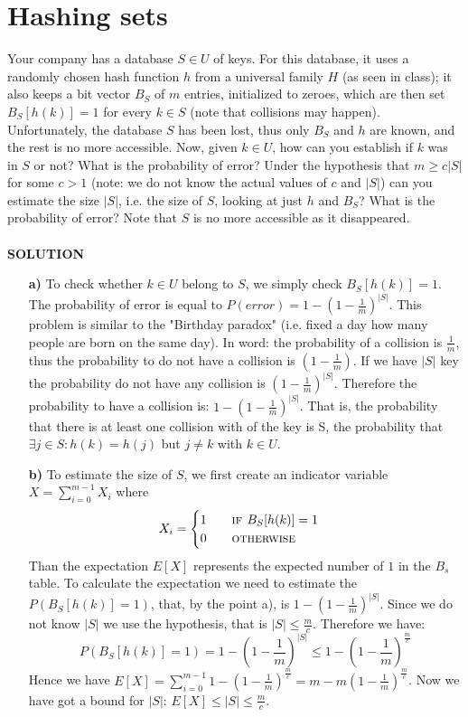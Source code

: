 \documentclass[a4paper]{article}
\begin{document}
\section*{Hashing sets}
Your company has a database $S \in U$ of keys. For this database, it uses a randomly chosen hash function $h$ from a universal family $H$ (as seen in class); it also keeps a bit vector $B_S$ of $m$ entries, initialized to zeroes, which are then set $B_S[h(k)] = 1$ for every $k \in S$ (note that collisions may happen). Unfortunately, the database $S$ has been lost, thus only $B_S$ and $h$ are known, and the rest is no more accessible. Now, given $k \in U$, how can you establish if $k$ was in $S$ or not? What is the probability of error? Under the hypothesis that $m \geq c|S|$ for some $c > 1$ (note: we do not know the actual values of $c$ and $|S|$) can you estimate the size $|S|$, i.e. the size of $S$, looking at just $h$ and $B_S$? What is the probability of error? Note that $S$ is no more accessible as it disappeared.\\ 
\\
\textbf{SOLUTION}
\\

\begin{itemize}
\item[\textbf{a)}] To check whether $k\in U$ belong to $S$, we simply check $B_S[h(k)]=1$. The probability of error is equal to $P(error)=1-(1 - \frac{1}{m})^{|S|}$. This problem is similar to the "Birthday paradox" (i.e. fixed a day how many people are born on the same day). In word: the probability of a collision is $\frac{1}{m}$, thus the probability to do not have a collision is $(1-\frac{1}{m})$. If we have $|S|$ key the probability do not have any collision is $(1 - \frac{1}{m})^{|S|}$. Therefore the probability to have a collision is: $1-(1 - \frac{1}{m})^{|S|}$. That is, the probability that there is at least one collision with of the key is S, the probability that $\exists j\in S : h(k)=h(j)$ but $j\neq k$ with $k \in U$.
\item[\textbf{b)}] To estimate the size of $S$, we first create an indicator variable $X=\sum_{i=0}^{m-1}X_i$ where
\begin{equation}
X_{i} =  
\begin{cases} 
1 \qquad \textsc{if }B_S[h(k)]=1\\
0 \qquad \textsc{otherwise}
\end{cases}
\nonumber
\end{equation}
Than the expectation $E[X]$ represents the expected number of $1$ in the $B_s$ table. To calculate the expectation we need to estimate the $P(B_S[h(k)]=1)$, that, by the point a), is $1-(1 - \frac{1}{m})^{|S|}$. Since we do not know $|S|$ we use the hypothesis, that is $|S|\leq \frac{m}{c}$. Therefore we have:
\begin{equation}
P(B_S[h(k)]=1)=1-(1 - \frac{1}{m})^{|S|} \leq 1-(1 - \frac{1}{m})^{\frac{m}{c}}
\nonumber
\end{equation}
Hence we have $E[X]= \sum_{i=0}^{m-1} 1-(1 - \frac{1}{m})^{\frac{m}{c}}=m-m(1 - \frac{1}{m})^{\frac{m}{c}}$. Now we have got a bound for $|S|$: $E[X]\leq|S|\leq \frac{m}{c}$.
\end{itemize}
\end{document}
